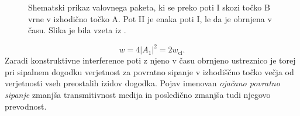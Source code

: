 \documentclass[10pt,a4paper]{article}
\begin{document}
\begin{minipage}[t]{0.39\textwidth}
\begin{figure}[H]
\caption{Shematski prikaz valovnega paketa, ki se preko poti I skozi točko B vrne v izhodično točko A. Pot II je enaka poti I, le da je obrnjena v času. Slika je bila vzeta iz \cite{lagendijk2009fifty}.}
\label{fig:paths} 
\end{figure}
\end{minipage}
\begin{equation}
w=4\left|A_1\right|^2=2w_\mathrm{cl}.
\end{equation}
Zaradi konstruktivne interference poti z njeno v času obrnjeno ustreznico je torej pri sipalnem dogodku verjetnost za povratno sipanje v izhodiščno točko večja od verjetnosti vseh preostalih izidov dogodka. Pojav imenovan \emph{ojačano povratno sipanje} zmanjša transmitivnost medija in posledično zmanjša tudi njegovo prevodnost. 
\end{document}
